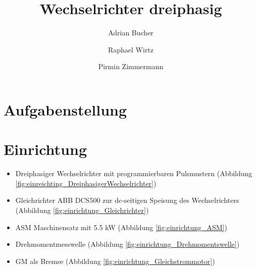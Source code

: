 \documentclass[a4paper,11pt,oneside]{book}
\title{Wechselrichter dreiphasig}
\begin{document}
\pagestyle{plain}

\author[*]{Adrian Bucher}
\author[**]{Raphael Wirtz}
\author[***]{Pirmin Zimmermann}

\renewcommand*{\Authsep}{\\}
\renewcommand*{\Authand}{\\}
\renewcommand\Authands{\\}

\thispagestyle{empty}
\begin{titlepage}	%

\end{titlepage}
\clearpage 

\frontmatter	%

\dominitoc
\tableofcontents
\adjustmtc
{}
\clearpage
\dominilof
\listoffigures
\adjustmtc
\mtcaddchapter
\nomlfpagenumbers
{}
\clearpage
\dominilot
\listoftables
\adjustmtc
{}
\mtcaddchapter
\clearpage


%

\chapter{Aufgabenstellung}

\mainmatter		%
\chapter{Einrichtung}
\begin{itemize}  
\item Dreiphasiger Wechselrichter mit programmierbaren Pulsmustern
(Abbildung \ref{fig:einreichting_DreiphasigerWechselrichter})
\item Gleichrichter ABB DCS500 zur dc-seitigen Speisung des Wechselrichters
(Abbildung \ref{fig:einrichtung_Gleichrichter})
\item ASM Maschinensatz mit 5.5 kW
(Abbildung \ref{fig:einrichtung_ASM})
\item Drehmomentmesswelle
(Abbildung \ref{fig:einrichtung_Drehmomentswelle})
\item GM als Bremse
(Abbildung \ref{fig:einrichtung_Gleichstrommotor})
\end{itemize}
\end{document}
